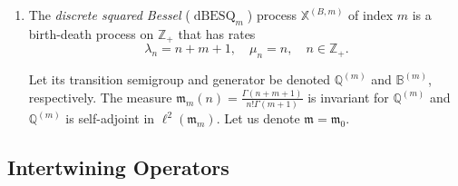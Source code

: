 \documentclass[11pt,a4,reqno]{amsart}
\numberwithin{equation}{section}
\theoremstyle{definition}
\theoremstyle{remark}
\newcommand{\bb}[1]{\mathbb{#1}}
\newcommand{\frk}[1]{\mathfrak{#1}}
\newcommand{\Z}{\bb{Z}}
\DeclareMathOperator{\dbesq}{dBESQ}
\newcommand{\beq}{\begin{equation}}
\newcommand{\eeq}{\end{equation}}
\begin{document}
	\begin{enumerate}
	
		\item The \textit{discrete squared Bessel} ($\dbesq_m$) process $\bb{X}^{(B, m)}$ of index $m$ is a birth-death process on $\Z_+$ that has rates
		\beq \lambda_n = n + m + 1, \quad \mu_n = n , \quad n \in \Z_+. \eeq
		
		Let its transition semigroup and generator be denoted $\bb{Q}^{(m)}$ and $\bb{B}^{(m)}$, respectively. The measure $\frk{m}_m(n) = \frac{\Gamma(n + m + 1)}{n! \Gamma(m + 1)}$ is invariant for $\bb{Q}^{(m)}$ and $\bb{Q}^{(m)}$ is self-adjoint in $\ell^2(\frk{m}_m)$. Let us denote $\frk{m} = \frk{m}_0$. 

	
	
	\end{enumerate}

\subsection{Intertwining Operators}
\end{document}
